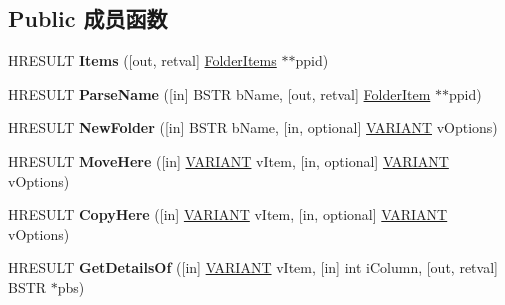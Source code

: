 \subsection*{Public 成员函数}
\begin{DoxyCompactItemize}
\item 
\mbox{\label{interface_shell32_1_1_folder_a5be6e33bc5eef888ddc66dc8cd3f8365}} 
H\+R\+E\+S\+U\+LT {\bfseries Items} (\mbox{[}out, retval\mbox{]} \hyperlink{interface_shell32_1_1_folder_items}{Folder\+Items} $\ast$$\ast$ppid)
\item 
\mbox{\label{interface_shell32_1_1_folder_afc3e0db01c68e4e758ea74b7091377ba}} 
H\+R\+E\+S\+U\+LT {\bfseries Parse\+Name} (\mbox{[}in\mbox{]} B\+S\+TR b\+Name, \mbox{[}out, retval\mbox{]} \hyperlink{interface_shell32_1_1_folder_item}{Folder\+Item} $\ast$$\ast$ppid)
\item 
\mbox{\label{interface_shell32_1_1_folder_a1ed3d76ce74d9a08a58316312c424c2e}} 
H\+R\+E\+S\+U\+LT {\bfseries New\+Folder} (\mbox{[}in\mbox{]} B\+S\+TR b\+Name, \mbox{[}in, optional\mbox{]} \hyperlink{structtag_v_a_r_i_a_n_t}{V\+A\+R\+I\+A\+NT} v\+Options)
\item 
\mbox{\label{interface_shell32_1_1_folder_a4b55378d112f5f882078f07b682be9fc}} 
H\+R\+E\+S\+U\+LT {\bfseries Move\+Here} (\mbox{[}in\mbox{]} \hyperlink{structtag_v_a_r_i_a_n_t}{V\+A\+R\+I\+A\+NT} v\+Item, \mbox{[}in, optional\mbox{]} \hyperlink{structtag_v_a_r_i_a_n_t}{V\+A\+R\+I\+A\+NT} v\+Options)
\item 
\mbox{\label{interface_shell32_1_1_folder_a5d2d94434bc97cdb53a06bf9134ca5fd}} 
H\+R\+E\+S\+U\+LT {\bfseries Copy\+Here} (\mbox{[}in\mbox{]} \hyperlink{structtag_v_a_r_i_a_n_t}{V\+A\+R\+I\+A\+NT} v\+Item, \mbox{[}in, optional\mbox{]} \hyperlink{structtag_v_a_r_i_a_n_t}{V\+A\+R\+I\+A\+NT} v\+Options)
\item 
\mbox{\label{interface_shell32_1_1_folder_ac3b4193d7b3f539ac50396074789a870}} 
H\+R\+E\+S\+U\+LT {\bfseries Get\+Details\+Of} (\mbox{[}in\mbox{]} \hyperlink{structtag_v_a_r_i_a_n_t}{V\+A\+R\+I\+A\+NT} v\+Item, \mbox{[}in\mbox{]} int i\+Column, \mbox{[}out, retval\mbox{]} B\+S\+TR $\ast$pbs)
\end{DoxyCompactItemize}
